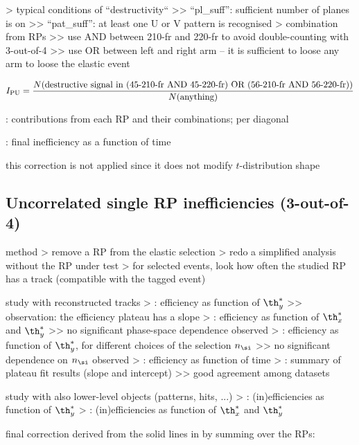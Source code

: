 \>> typical conditions of ``destructivity``
\>>> ``pl\_suff'': sufficient number of planes is on
\>>> ``pat\_suff'': at least one U or V pattern is recognised 
\>> combination from RPs
\>>> use AND between 210-fr and 220-fr to avoid double-counting with 3-out-of-4
\>>> use OR between left and right arm -- it is sufficient to loose any arm to loose the elastic event

$$I_{\rm PU} = {N(\hbox{destructive signal in (45-210-fr AND 45-220-fr) OR (56-210-fr AND 56-220-fr)})\over N(\hbox{anything})}$$


\> : contributions from each RP and their combinations; per diagonal

\> : final inefficiency as a function of time

\> this correction is not applied since it does not modify $t$-distribution shape



\subsection{Uncorrelated single RP inefficiencies (3-out-of-4)}

\> method
\>> remove a RP from the elastic selection
\>> redo a simplified analysis without the RP under test
\>> for selected events, look how often the studied RP has a track (compatible with the tagged event)

\> study with reconstructed tracks
\>> : efficiency as function of $\th_y^*$
\>>> observation: the efficiency plateau has a slope
\>> : efficiency as function of $\th_x^*$ and $\th_y^*$
\>>> no significant phase-space dependence observed
\>> : efficiency as function of $\th_y^*$, for different choices of the selection $n_\si$
\>>> no significant dependence on $n_\si$ observed
\>> : efficiency as function of time
\>> : summary of plateau fit results (slope and intercept)
\>>> good agreement among datasets

\> study with also lower-level objects (patterns, hits, ...)
\>> : (in)efficiencies as function of $\th_y^*$
\>> : (in)efficiencies as function of $\th_x^*$ and $\th_y^*$

\> final correction derived from the solid lines in  by summing over the RPs:

